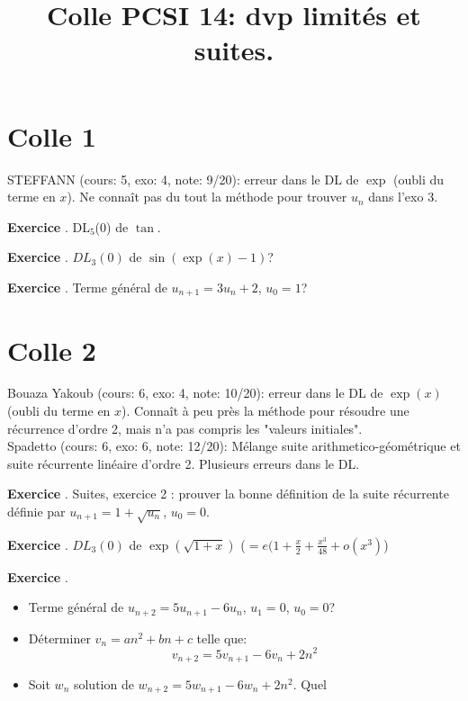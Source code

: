 \documentclass[10pt,a4paper]{article}
\title{Colle PCSI 14: dvp limités et suites.}
\newcounter{question}
\newcounter{exo}
\newenvironment{exo}{\vspace{0.5cm}\setcounter{question}{0}\addtocounter{exo}{1} \noindent \textbf{Exercice \theexo}. \normalsize }{\par}
\begin{document}
	\maketitle
	
	
	\section*{Colle 1}
	\setcounter{exo}{0}
	STEFFANN (cours: 5, exo: 4, note: 9/20): erreur dans le DL de $\exp$ (oubli du terme en $x$). Ne connaît pas du tout la méthode pour trouver $u_n$ dans l'exo 3.\\
	
	\begin{exo}
		DL$_5$(0) de $\tan$.
	\end{exo}
	
	\begin{exo}
		$DL_3(0)$ de $\sin(\exp(x) - 1)$?
	\end{exo}
	
	\begin{exo}
		Terme général de $u_{n+1} = 3 u_n + 2$, $u_0 = 1$?
	\end{exo}
	
	\section*{Colle 2}
	\setcounter{exo}{0}
	Bouaza Yakoub (cours: 6, exo: 4, note: 10/20): erreur dans le DL de $\exp(x)$ (oubli du terme en $x$). Connaît à peu près la méthode pour résoudre une récurrence d'ordre 2, mais n'a pas compris les "valeurs initiales".\\
	Spadetto (cours: 6, exo: 6, note: 12/20): Mélange suite arithmetico-géométrique et suite récurrente linéaire d'ordre 2. Plusieurs erreurs dans le DL. \\
	
	\begin{exo}
		 Suites, exercice 2 : prouver la bonne définition de la suite récurrente définie par $u_{n+1} = 1 + \sqrt{u_n}$, $u_0 = 0$.
	\end{exo}

	\begin{exo}
		$DL_3(0)$ de $\exp(\sqrt{1+x})$ ($= e(1 + \frac{x}{2} + \frac{x^3}{48} + o(x^3)$)
	\end{exo}

	\begin{exo}
		\begin{itemize}
			\item Terme général de $u_{n+2} = 5 u_{n+1} - 6 u_n$, $u_1 = 0$, $u_0 = 0$?
			\item Déterminer $v_n = a n^2 + bn + c$ telle que:
			$$v_{n+2} = 5 v_{n+1} - 6 v_n + 2n^2$$
			\item Soit $w_n$ solution de $w_{n+2} = 5 w_{n+1} - 6 w_n + 2n^2$. Quel 
		\end{itemize}
	\end{exo}
				
\end{document}
